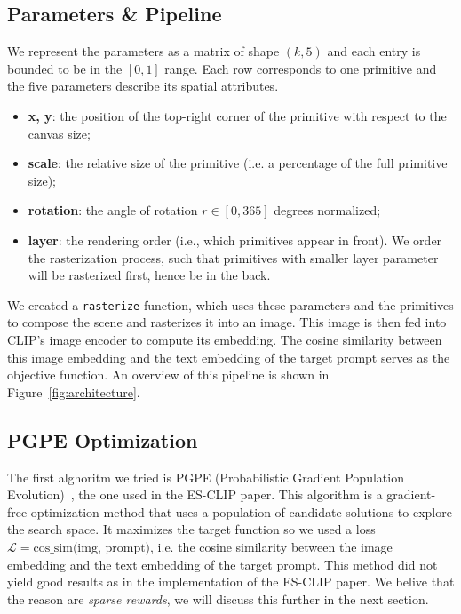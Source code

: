 \documentclass{article}
\begin{document}
\subsection{Parameters \& Pipeline}
We represent the parameters as a matrix of shape $\left(k, 5\right)$ and each entry is bounded to be in the $[0, 1]$ range. Each row corresponds to one primitive and the five parameters describe its spatial attributes.   
\begin{itemize}
    \item \textbf{x, y}: the position of the top-right corner of the primitive with respect to the canvas size;
    \item \textbf{scale}: the relative size of the primitive (i.e. a percentage of the full primitive size);
    \item \textbf{rotation}: the angle of rotation $r \in [0,365]$ degrees normalized;
    \item \textbf{layer}: the rendering order (i.e., which primitives appear in front). We order the rasterization process, such that primitives with smaller layer parameter will be rasterized first, hence be in the back.
\end{itemize}
We created a \texttt{rasterize} function, which uses these parameters and the primitives to compose the scene and rasterizes it into an image. This image is then fed into CLIP’s image encoder to compute its embedding. The cosine similarity between this image embedding and the text embedding of the target prompt serves as the objective function.
An overview of this pipeline is shown in Figure~\ref{fig:architecture}.

\subsection{PGPE Optimization}
The first alghoritm we tried is PGPE (Probabilistic Gradient Population Evolution)~\cite{toklu2020clipup}, the one used in the ES-CLIP paper.
This algorithm is a gradient-free optimization method that uses a population of candidate solutions to explore the search space. 
It maximizes the target function so we used a loss $\mathcal{L} = \text{cos\_sim(img, prompt)}$, i.e. the cosine similarity between the image embedding and the text embedding of the target prompt.
This method did not yield good results as in the implementation of the ES-CLIP paper. We belive that the reason are \textit{sparse rewards}, we will discuss this further in the next section.
\end{document}
